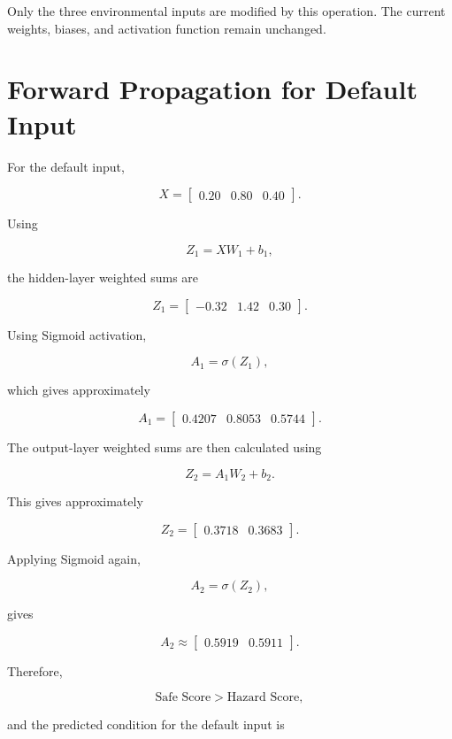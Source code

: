 \documentclass[12pt]{article}
\begin{document}
Only the three environmental inputs are modified by this operation.
The current weights, biases, and activation function remain unchanged.


\section{Forward Propagation for Default Input}

For the default input,

\[
X =
\begin{bmatrix}
0.20 & 0.80 & 0.40
\end{bmatrix}.
\]

Using

\[
Z_1=XW_1+b_1,
\]

the hidden-layer weighted sums are

\[
Z_1 =
\begin{bmatrix}
-0.32 & 1.42 & 0.30
\end{bmatrix}.
\]

Using Sigmoid activation,

\[
A_1=\sigma(Z_1),
\]

which gives approximately

\[
A_1 =
\begin{bmatrix}
0.4207 & 0.8053 & 0.5744
\end{bmatrix}.
\]

The output-layer weighted sums are then calculated using

\[
Z_2=A_1W_2+b_2.
\]

This gives approximately

\[
Z_2 =
\begin{bmatrix}
0.3718 & 0.3683
\end{bmatrix}.
\]

Applying Sigmoid again,

\[
A_2=\sigma(Z_2),
\]

gives

\[
A_2 \approx
\begin{bmatrix}
0.5919 & 0.5911
\end{bmatrix}.
\]

Therefore,

\[
\text{Safe Score} > \text{Hazard Score},
\]

and the predicted condition for the default input is
\end{document}
